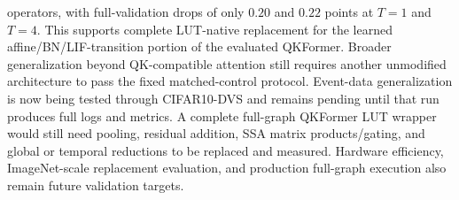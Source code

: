 operators, with full-validation drops of only $0.20$ and $0.22$ points at
$T=1$ and $T=4$. This supports complete LUT-native replacement for the learned
affine/BN/LIF-transition portion of the evaluated QKFormer.
Broader generalization beyond QK-compatible attention still requires another
unmodified architecture to pass the fixed matched-control protocol. Event-data
generalization is now being tested through CIFAR10-DVS and remains pending
until that run produces full logs and metrics. A complete full-graph QKFormer
LUT wrapper would still need pooling, residual addition, SSA matrix
products/gating, and global or temporal reductions to be replaced and measured.
Hardware efficiency, ImageNet-scale replacement evaluation, and production
full-graph execution also remain future validation targets.
